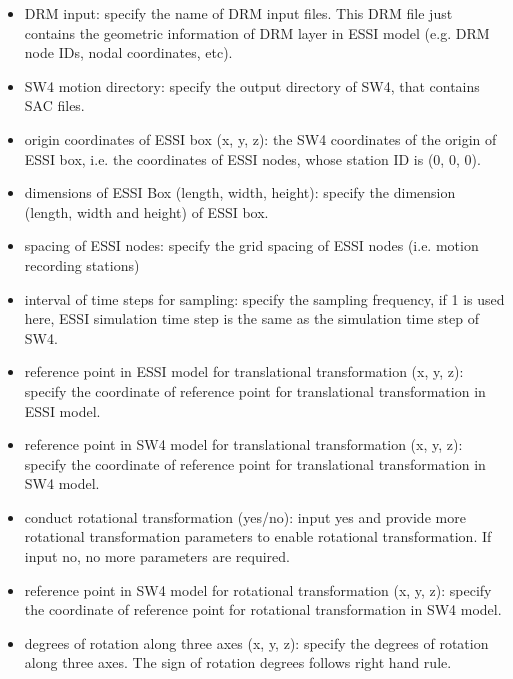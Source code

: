 \begin{itemize}

  \item DRM input: specify the name of DRM input files. This DRM file just contains the geometric information of DRM layer in ESSI model (e.g. DRM node IDs, nodal coordinates, etc). 

  \item SW4 motion directory: specify the output directory of SW4, that contains SAC files. 

  \item origin coordinates of ESSI box (x, y, z): the SW4 coordinates of the origin of ESSI box, i.e. the coordinates of ESSI nodes, whose station ID is (0, 0, 0). 

  \item dimensions of ESSI Box (length, width, height): specify the dimension (length, width and height) of ESSI box. 

  \item spacing of ESSI nodes: specify the grid spacing of ESSI nodes (i.e. motion recording stations)

  \item interval of time steps for sampling: specify the sampling frequency, if 1 is used here, ESSI simulation time step is the same as the simulation time step of SW4.   

  \item reference point in ESSI model for translational transformation (x, y, z): specify the coordinate of reference point for translational transformation in ESSI model. 

  \item reference point in SW4 model for translational transformation (x, y, z): specify the coordinate of reference point for translational transformation in SW4 model. 

  \item conduct rotational transformation (yes/no): input yes and provide more rotational transformation parameters to enable rotational transformation. If input no, no more parameters are required.  

  \item reference point in SW4 model for rotational transformation (x, y, z): specify the coordinate of reference point for rotational transformation in SW4 model. 

  \item degrees of rotation along three axes (x, y, z): specify the degrees of rotation along three axes. The sign of rotation degrees follows right hand rule. 

\end{itemize}

